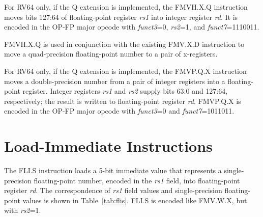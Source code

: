 For RV64 only, if the Q extension is implemented,
the FMVH.X.Q instruction moves bits 127:64 of floating-point register {\em rs1}
into integer register {\em rd}.
It is encoded in the OP-FP major opcode with {\em funct3}=0, {\em rs2}=1,
and {\em funct7}=1110011.

\begin{commentary}
FMVH.X.Q is used in conjunction with the existing FMV.X.D instruction to move
a quad-precision floating-point number to a pair of x-registers.
\end{commentary}

For RV64 only, if the Q extension is implemented,
the FMVP.Q.X instruction moves a double-precision number from a pair of integer
registers into a floating-point register.  Integer registers {\em rs1} and
{\em rs2} supply bits 63:0 and 127:64, respectively; the result is written to
floating-point register {\em rd}.
FMVP.Q.X is encoded in the OP-FP major opcode with {\em funct3}=0
and {\em funct7}=1011011.


\section{Load-Immediate Instructions}

The FLI.S instruction loads a 5-bit immediate value that represents
a single-precision floating-point number, encoded in the {\em rs1} field, into
floating-point register {\em rd}.
The correspondence of {\em rs1} field values and single-precision
floating-point values is shown in Table~\ref{tab:flis}.
FLI.S is encoded like FMV.W.X, but with {\em rs2}=1.

